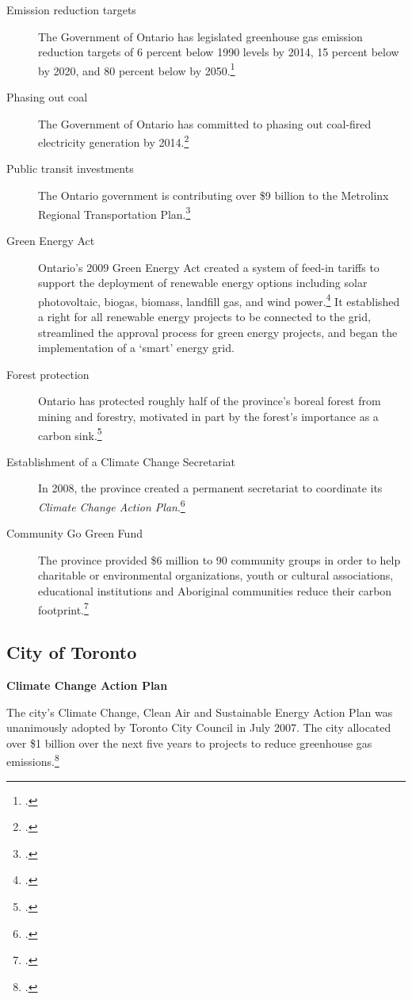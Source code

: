 \documentclass[10pt]{article}
\begin{document}
\begin{description}
	\item[Emission reduction targets] The Government of Ontario has legislated greenhouse gas emission reduction targets of 6 percent below 1990 levels by 2014, 15 percent below by 2020, and 80 percent below by 2050.\footcite[][p.3]{20082009ActionPlan}
	\item[Phasing out coal] The Government of Ontario has committed to phasing out coal-fired electricity generation by 2014.\footcite[][]{EPACessation}
	\item[Public transit investments] The Ontario government is contributing over \$9 billion to the Metrolinx Regional Transportation Plan.\footcite[][]{OMEGreening}
	\item[Green Energy Act] Ontario's 2009 Green Energy Act created a system of feed-in tariffs to support the deployment of renewable energy options including solar photovoltaic, biogas, biomass, landfill gas, and wind power.\footcite[][]{OMEGreen} 
It established a right for all renewable energy projects to be connected to the grid, streamlined the approval process for green energy projects, and began the implementation of a `smart' energy grid.
	\item[Forest protection] Ontario has protected roughly half of the province's boreal forest from mining and forestry, motivated in part by the forest's importance as a carbon sink.\footcite[][]{RobbingCarbonBank}
	\item[Establishment of a Climate Change Secretariat] In 2008, the province created a permanent secretariat to coordinate its \emph{Climate Change Action Plan}.\footcite[][]{OMEGreening}
	\item[Community Go Green Fund] The province provided \$6 million to 90 community groups in order to help charitable or environmental organizations, youth or cultural associations, educational institutions and Aboriginal communities reduce their carbon footprint.\footcite[][]{OMEGreening}
\end{description}	



	\subsection{City of Toronto}



\textbf{Climate Change Action Plan}



The city's Climate Change, Clean Air and Sustainable Energy Action Plan was unanimously adopted by Toronto City Council in July 2007. The city allocated over \$1 billion over the next five years to projects to reduce greenhouse gas emissions.\footcite{TorontoEnvOff2007}
\end{document}

